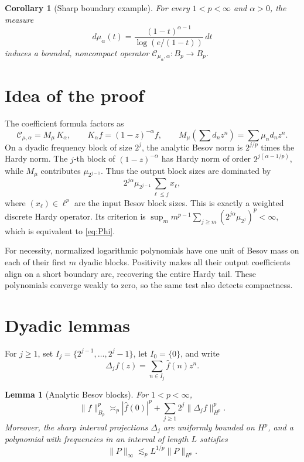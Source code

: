 \documentclass[11pt]{article}
\newtheorem{lemma}[theorem]{Lemma}
\newtheorem{corollary}[theorem]{Corollary}
\newcommand{\Cma}{\mathcal C_{\mu,\alpha}}
\begin{document}
\begin{corollary}[Sharp boundary example]\label{cor:example}
For every \(1<p<\infty\) and \(\alpha>0\), the measure
\[
 d\mu_\alpha(t)=
 \frac{(1-t)^{\alpha-1}}{\log(e/(1-t))}\,dt
\]
induces a bounded, noncompact operator
\(\mathcal C_{\mu_\alpha,\alpha}:B_p\to B_p\).
\end{corollary}

\section{Idea of the proof}

The coefficient formula factors as
\[
 \Cma=M_\mu\,K_\alpha,
 \qquad K_\alpha f=(1-z)^{-\alpha}f,
 \qquad
 M_\mu\!\left(\sum d_nz^n\right)=\sum\mu_nd_nz^n.
\]
On a dyadic frequency block of size \(2^j\), the analytic Besov norm is
\(2^{j/p}\) times the Hardy norm.  The \(j\)-th block of
\((1-z)^{-\alpha}\) has Hardy norm of order
\(2^{j(\alpha-1/p)}\), while \(M_\mu\) contributes \(\mu_{2^{j-1}}\).
Thus the output block sizes are dominated by
\[
 2^{j\alpha}\mu_{2^{j-1}}
 \sum_{\ell\leq j}x_\ell,
\]
where \((x_\ell)\in\ell^p\) are the input Besov block sizes.  This is exactly
a weighted discrete Hardy operator.  Its criterion is
\(\sup_m m^{p-1}\sum_{j\geq m}(2^{j\alpha}\mu_{2^j})^p<\infty\),
which is equivalent to \eqref{eq:Phi}.

For necessity, normalized logarithmic polynomials have one unit of Besov
mass on each of their first \(m\) dyadic blocks.  Positivity makes all their
output coefficients align on a short boundary arc, recovering the entire
Hardy tail.  These polynomials converge weakly to zero, so the same test also
detects compactness.

\section{Dyadic lemmas}

For \(j\geq1\), set
\(I_j=\{2^{j-1},\ldots,2^j-1\}\), let \(I_0=\{0\}\), and write
\[
 \Delta_jf(z)=\sum_{n\in I_j}\widehat f(n)z^n.
\]

\begin{lemma}[Analytic Besov blocks]\label{lem:besov}
For \(1<p<\infty\),
\begin{equation}\label{eq:dyadicnorm}
 \|f\|_{B_p}^p\asymp_p
 |\widehat f(0)|^p+
 \sum_{j\geq1}2^j\|\Delta_jf\|_{H^p}^p.
\end{equation}
Moreover, the sharp interval projections \(\Delta_j\) are uniformly bounded
on \(H^p\), and a polynomial with frequencies in an interval of length
\(L\) satisfies
\begin{equation}\label{eq:nikolskii}
 \|P\|_\infty\lesssim_p L^{1/p}\|P\|_{H^p}.
\end{equation}
\end{lemma}
\end{document}

